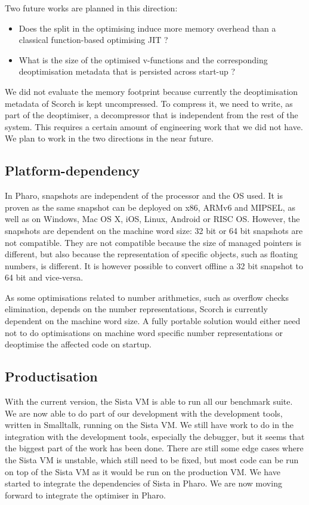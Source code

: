 \documentclass[a4paper,12pt,twoside]{../includes/ThesisStyle}
\begin{document}
Two future works are planned in this direction:
\begin{itemize}
	\item Does the split in the optimising induce more memory overhead than a classical function-based optimising JIT ?
	\item What is the size of the optimised v-functions and the corresponding deoptimisation metadata that is persisted across start-up ?
\end{itemize}

We did not evaluate the memory footprint because currently the deoptimisation metadata of Scorch is kept uncompressed. To compress it, we need to write, as part of the deoptimiser, a decompressor that is independent from the rest of the system. This requires a certain amount of engineering work that we did not have. We plan to work in the two directions in the near future.

\subsection{Platform-dependency}
\label{ss:FWPlatDep}

In Pharo, snapshots are independent of the processor and the OS used. It is proven as the same snapshot can be deployed on x86, ARMv6 and MIPSEL, as well as on Windows, Mac OS X, iOS, Linux, Android or RISC OS. However, the snapshots are dependent on the machine word size: 32 bit or 64 bit snapshots are not compatible. They are not compatible because the size of managed pointers is different, but also because the representation of specific objects, such as floating numbers, is different. It is however possible to convert offline a 32 bit snapshot to 64 bit and vice-versa. 

As some optimisations related to number arithmetics, such as overflow checks elimination, depends on the number representations, Scorch is currently dependent on the machine word size. A fully portable solution would either need not to do optimisations on machine word specific number representations or deoptimise the affected code on startup.

\subsection{Productisation}
\label{ss:FWProduct}

With the current version, the Sista VM is able to run all our benchmark suite. We are now able to do part of our development with the development tools, written in Smalltalk, running on the Sista VM. We still have work to do in the integration with the development tools, especially the debugger, but it seems that the biggest part of the work has been done. There are still some edge cases where the Sista VM is unstable, which still need to be fixed, but most code can be run on top of the Sista VM as it would be run on the production VM. We have started to integrate the dependencies of Sista in Pharo. We are now moving forward to integrate the optimiser in Pharo.
\end{document}
